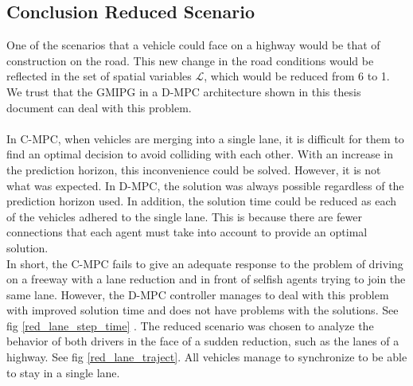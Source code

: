 \subsection{Conclusion Reduced Scenario}

One of the scenarios that a vehicle could face on a highway would be that of construction on the road. This new change in the road conditions would be reflected in the set of spatial variables $\mathcal{L}$, which would be reduced from 6 to 1. We trust that the GMIPG in a D-MPC architecture shown in this thesis document can deal with this problem.
\\

\\
In C-MPC, when vehicles are merging into a single lane, it is difficult for them to find an optimal decision to avoid colliding with each other. With an increase in the prediction horizon, this inconvenience could be solved. However, it is not what was expected.
In D-MPC, the solution was always possible regardless of the prediction horizon used. In addition, the solution time could be reduced as each of the vehicles adhered to the single lane. This is because there are fewer connections that each agent must take into account to provide an optimal solution.
\\

In short, the C-MPC fails to give an adequate response to the problem of driving on a freeway with a lane reduction and in front of selfish agents trying to join the same lane. However, the D-MPC controller manages to deal with this problem with improved solution time and does not have problems with the solutions. See fig \ref{red_lane_step_time} .
The reduced scenario was chosen to analyze the behavior of both drivers in the face of a sudden reduction, such as the lanes of a highway. See fig \ref{red_lane_traject}. All vehicles manage to synchronize to be able to stay in a single lane.
